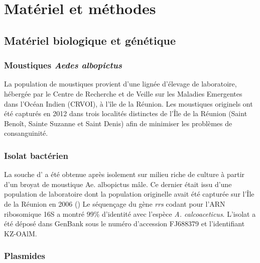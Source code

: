\chapter{Matériel et méthodes}

\section{Matériel biologique et génétique}

\subsection{Moustiques \textit{Aedes albopictus}}
\label{par:moustiques}
La population de moustiques  provient d'une lignée d'élevage de laboratoire, hébergée par le Centre de Recherche et de Veille sur les Maladies Emergentes dans l'Océan Indien (CRVOI), à l'île de la Réunion.
Les moustiques originels ont été capturés en 2012 dans trois localités distinctes de l'Île de la Réunion (Saint Benoît, Sainte Suzanne et Saint Denis) afin de minimiser les problèmes de consanguinité.

\subsection{Isolat bactérien}
La souche d' a été obtenue après isolement sur milieu riche de culture à partir d'un broyat de moustique Ae. albopictus mâle. Ce dernier était issu d'une population de laboratoire dont la population originelle avait été capturée sur l'Île de la Réunion en 2006 (\textcite{zouache2009})
Le séquençage du gène \textit{rrs} codant pour l'ARN ribosomique 16S a montré 99\% d'identité avec l'espèce \textit{A. calcoaceticus}. L'isolat a été déposé dans GenBank sous le numéro d'accession FJ688379 et l'identifiant KZ-OAlM.

\subsection{Plasmides}

